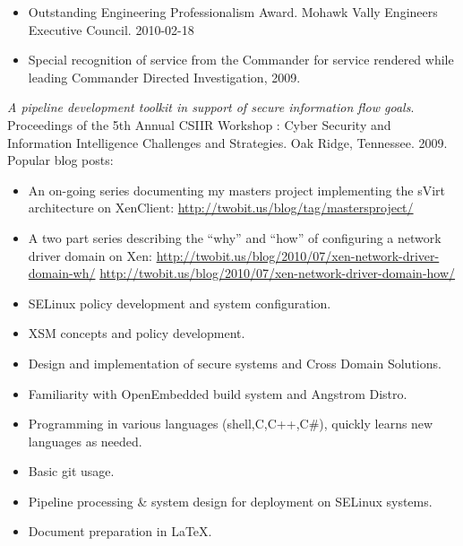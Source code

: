 \documentclass[letterpaper,11pt]{article}
\begin{document}
    \begin {itemize}
      \setlength {\itemsep}{1pt}
      \setlength {\parskip}{0pt}
      \setlength {\parsep}{0pt}
    \item Outstanding Engineering Professionalism Award.
      Mohawk Vally Engineers Executive Council.
      2010-02-18
    \item Special recognition of service from the Commander for service rendered while leading Commander Directed Investigation, 2009.
    \end {itemize}

    {\it A pipeline development toolkit in support of secure information flow goals}.
    Proceedings of the 5th Annual CSIIR Workshop : Cyber Security and Information Intelligence Challenges and Strategies.
    Oak Ridge, Tennessee.
    2009.\\
    Popular blog posts:
    \begin {itemize}
      \setlength {\itemsep}{1pt}
      \setlength {\parskip}{0pt}
      \setlength {\parsep}{0pt}
    \item
      An on-going series documenting my masters project implementing the sVirt architecture on XenClient:
      \url{http://twobit.us/blog/tag/mastersproject/}
    \item
      A two part series describing the ``why'' and ``how'' of configuring a network driver domain on Xen:
      \url{http://twobit.us/blog/2010/07/xen-network-driver-domain-wh/}
      \url{http://twobit.us/blog/2010/07/xen-network-driver-domain-how/}
    \end {itemize}
    \begin {itemize}
      \setlength {\itemsep}{1pt}
      \setlength {\parskip}{0pt}
      \setlength {\parsep}{0pt}
      \item SELinux policy development and system configuration.
      \item XSM concepts and policy development.
      \item Design and implementation of secure systems and Cross Domain Solutions.
      \item Familiarity with OpenEmbedded build system and Angstrom Distro.
      \item Programming in various languages (shell,C,C++,C\#), quickly learns new languages as needed.
      \item Basic git usage.
      \item Pipeline processing \& system design for deployment on SELinux systems.
      \item Document preparation in \LaTeX.
    \end {itemize}
\end{document}
